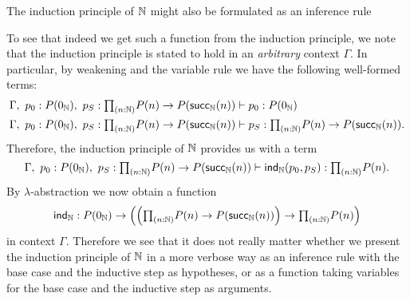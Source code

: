 \begin{rmk}
  The induction principle of $\N$ might also be formulated as an inference rule
  \begin{prooftree}
  \end{prooftree}
  To see that indeed we get such a function from the induction principle, we note that the induction principle is stated to hold in an \emph{arbitrary} context $\Gamma$. In particular, by weakening and the variable rule we have the following well-formed terms:
  \begin{align*}
    \Gamma,~p_0:P(\zeroN),~p_S:\prd{n:\N}P(n)\to P(\succN(n)) & \vdash p_0 : P(\zeroN) \\
    \Gamma,~p_0:P(\zeroN),~p_S:\prd{n:\N}P(n)\to P(\succN(n)) & \vdash p_S : \prd{n:\N}P(n)\to P(\succN(n)).
  \end{align*}
  Therefore, the induction principle of $\N$ provides us with a term
  \begin{equation*}
    \Gamma,~p_0:P(\zeroN),~p_S:\prd{n:\N}P(n)\to P(\succN(n)) \vdash \mathsf{ind}_\N(p_0,p_S) : \prd{n:\N}P(n).
  \end{equation*}
  By $\lambda$-abstraction we now obtain a function
  \begin{equation*}
    \mathsf{ind}_\N : P(\zeroN)\to \Big(\Big(\prd{n:\N}P(n)\to P(\succN(n))\Big) \to \prd{n:\N}P(n)\Big)
  \end{equation*}
  in context $\Gamma$. Therefore we see that it does not really matter whether we present the induction principle of $\N$ in a more verbose way as an inference rule with the base case and the inductive step as hypotheses, or as a function taking variables for the base case and the inductive step as arguments.
\end{rmk}

